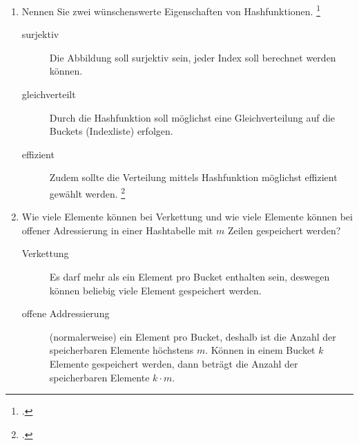 \documentclass{bschlangaul-aufgabe}
\begin{document}

\begin{enumerate}


\item Nennen Sie zwei wünschenswerte Eigenschaften von Hashfunktionen.
\footcite{examen:66115:2021:03}

\begin{bAntwort}
\begin{description}
\item[surjektiv]

Die Abbildung soll surjektiv sein, \dh jeder Index soll berechnet werden
können.

\item[gleichverteilt]

Durch die Hashfunktion soll möglichst eine Gleichverteilung auf die
Buckets (Indexliste) erfolgen.

\item[effizient]

Zudem sollte die Verteilung mittels Hashfunktion möglichst effizient
gewählt werden.
\footcite{wiki:hashfunktion}
\end{description}
\end{bAntwort}


\item Wie viele Elemente können bei Verkettung und wie viele Elemente
können bei offener Adressierung in einer Hashtabelle mit $m$ Zeilen
gespeichert werden?

\begin{bAntwort}
\begin{description}
\item[Verkettung]

Es darf mehr als ein Element pro Bucket enthalten sein, deswegen können
beliebig viele Element gespeichert werden.

\item[offene Addressierung]

(normalerweise) ein Element pro Bucket, deshalb ist die Anzahl der
speicherbaren Elemente höchstens $m$. Können in einem Bucket $k$
Elemente gespeichert werden, dann beträgt die Anzahl der speicherbaren
Elemente $k \cdot m$.
\end{description}
\end{bAntwort}


\end{enumerate}
\end{document}
